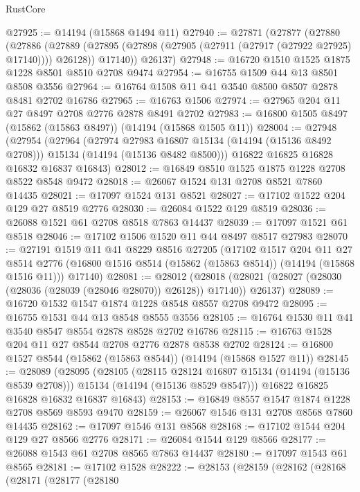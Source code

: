 \begin{lexlean}{RustCore}
\begin{coremodule}
@27925 := @14194 (@15868 @1494 @11)
@27940 := @27871
    (@27877
      (@27880
        (@27886
          (@27889 (@27895 (@27898 (@27905 (@27911 (@27917 (@27922 @27925) @17140)))) @26128))
          @17140))
      @26137)
@27948 := @16720 @1510 @1525 @1875 @1228 @8501 @8510 @2708 @9474
@27954 := @16755 @1509 @44 @13 @8501 @8508 @3556
@27964 := @16764 @1508 @11 @41 @3540 @8500 @8507 @2878 @8481 @2702 @16786
@27965 := @16763 @1506
@27974 := @27965 @204 @11 @27 @8497 @2708 @2776 @2878 @8491 @2702
@27983 := @16800 @1505 @8497 (@15862 (@15863 @8497)) (@14194 (@15868 @1505 @11))
@28004 := @27948
    (@27954
      (@27964
        (@27974 @27983 @16807 @15134 (@14194 (@15136 @8492 @2708)))
        @15134
        (@14194 (@15136 @8482 @8500)))
      @16822
      @16825
      @16828
      @16832
      @16837
      @16843)
@28012 := @16849 @8510 @1525 @1875 @1228 @2708 @8522 @8548 @9472
@28018 := @26067 @1524 @131 @2708 @8521 @7860 @14435
@28021 := @17097 @1524 @131 @8521
@28027 := @17102 @1522 @204 @129 @27 @8519 @2776
@28030 := @26084 @1522 @129 @8519
@28036 := @26088 @1521 @61 @2708 @8518 @7863 @14437
@28039 := @17097 @1521 @61 @8518
@28046 := @17102 @1506 @1520 @11 @44 @8497 @8517 @27983
@28070 := @27191
    @1519
    @11
    @41
    @8229
    @8516
    @27205
    (@17102
      @1517
      @204
      @11
      @27
      @8514
      @2776
      (@16800 @1516 @8514 (@15862 (@15863 @8514)) (@14194 (@15868 @1516 @11)))
      @17140)
@28081 := @28012
    (@28018 (@28021 (@28027 (@28030 (@28036 (@28039 (@28046 @28070)) @26128)) @17140)) @26137)
@28089 := @16720 @1532 @1547 @1874 @1228 @8548 @8557 @2708 @9472
@28095 := @16755 @1531 @44 @13 @8548 @8555 @3556
@28105 := @16764 @1530 @11 @41 @3540 @8547 @8554 @2878 @8528 @2702 @16786
@28115 := @16763 @1528 @204 @11 @27 @8544 @2708 @2776 @2878 @8538 @2702
@28124 := @16800 @1527 @8544 (@15862 (@15863 @8544)) (@14194 (@15868 @1527 @11))
@28145 := @28089
    (@28095
      (@28105
        (@28115 @28124 @16807 @15134 (@14194 (@15136 @8539 @2708)))
        @15134
        (@14194 (@15136 @8529 @8547)))
      @16822
      @16825
      @16828
      @16832
      @16837
      @16843)
@28153 := @16849 @8557 @1547 @1874 @1228 @2708 @8569 @8593 @9470
@28159 := @26067 @1546 @131 @2708 @8568 @7860 @14435
@28162 := @17097 @1546 @131 @8568
@28168 := @17102 @1544 @204 @129 @27 @8566 @2776
@28171 := @26084 @1544 @129 @8566
@28177 := @26088 @1543 @61 @2708 @8565 @7863 @14437
@28180 := @17097 @1543 @61 @8565
@28181 := @17102 @1528
@28222 := @28153
    (@28159
      (@28162
        (@28168
          (@28171
            (@28177
              (@28180

\end{coremodule}
\end{lexlean}
